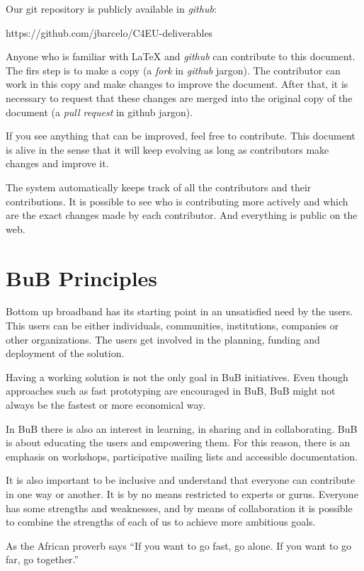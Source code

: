 \documentclass[draftclsnofoot,12pt,journal,onecolumn]{IEEEtran}
\begin{document}
Our git repository is publicly available in \emph{github}:

https://github.com/jbarcelo/C4EU-deliverables

Anyone who is familiar with {\LaTeX} and \emph{github} can contribute to this document.
The firs step is to make a copy (a \emph{fork} in \emph{github} jargon).
The contributor can work in this copy and make changes to improve the document.
After that, it is necessary to request that these changes are merged into the original copy of the document (a \emph{pull request} in github jargon).

If you see anything that can be improved, feel free to contribute.
This document is alive in the sense that it will keep evolving as long as contributors make changes and improve it.

The system automatically keeps track of all the contributors and their contributions.
It is possible to see who is contributing more actively and which are the exact changes made by each contributor.
And everything is public on the web.

\section{BuB Principles}
\label{sec:principles}

Bottom up broadband has its starting point in an unsatisfied need by the users.
This users can be either individuals, communities, institutions, companies or other organizations.
The users get involved in the planning, funding and deployment of the solution.

Having a working solution is not the only goal in BuB initiatives.
Even though approaches such as fast prototyping are encouraged in BuB, BuB might not always be the fastest or more economical way.

In BuB there is also an interest in learning, in sharing and in collaborating.
BuB is about educating the users and empowering them.
For this reason, there is an emphasis on workshops, participative mailing lists and accessible documentation.

It is also important to be inclusive and understand that everyone can contribute in one way or another.
It is by no means restricted to experts or gurus.
Everyone has some strengths and weaknesses, and by means of collaboration it is possible to combine the strengths of each of us to achieve more ambitious goals.

As the African proverb says ``If you want to go fast, go alone. If you want to go far, go together.''
\end{document}
